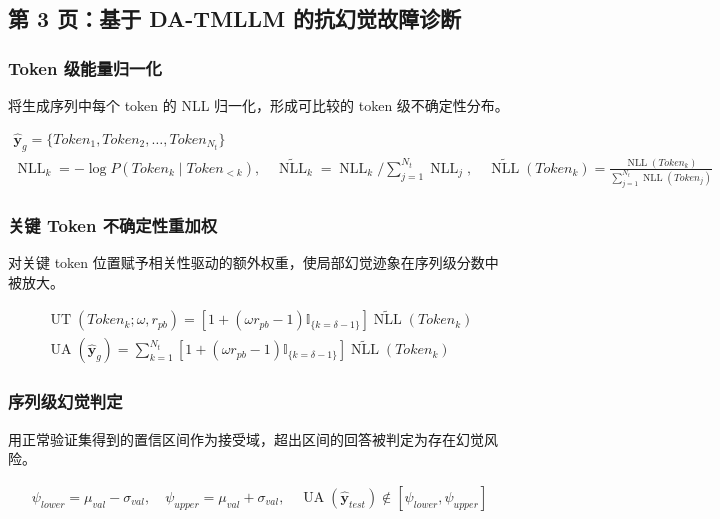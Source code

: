 ﻿\documentclass[UTF8,a4paper,10pt]{ctexart}
\begin{document}
\clearpage
\subsection{第 3 页：基于 DA-TMLLM 的抗幻觉故障诊断}

\subsubsection*{Token 级能量归一化}
将生成序列中每个 token 的 NLL 归一化，形成可比较的 token 级不确定性分布。
\begin{formulabox}
\[\begin{gathered}
  \hat{\bm y}_g
  =\{\mathit{Token}_1,\mathit{Token}_2,\dots,\mathit{Token}_{N_t}\} \\
  \operatorname{NLL}_k
  = -\log P(\mathit{Token}_k\mid \mathit{Token}_{<k}), \quad
  \tilde{\operatorname{NLL}}_k
  =
  \operatorname{NLL}_k\Big/
  \sum_{j=1}^{N_t}\operatorname{NLL}_j, \quad
  \widetilde{\operatorname{NLL}}(\mathit{Token}_k)
  =
  \frac{\operatorname{NLL}(\mathit{Token}_k)}
  {\sum_{j=1}^{N_t}\operatorname{NLL}(\mathit{Token}_j)} 
\end{gathered}\]
\end{formulabox}

\subsubsection*{关键 Token 不确定性重加权}
对关键 token 位置赋予相关性驱动的额外权重，使局部幻觉迹象在序列级分数中被放大。
\begin{formulabox}
\[\begin{gathered}
  \operatorname{UT}(\mathit{Token}_k;\omega,r_{pb})
  =
  \left[1+(\omega r_{pb}-1)\mathbb{I}_{\{k=\delta-1\}}\right]
  \widetilde{\operatorname{NLL}}(\mathit{Token}_k) \\
  \operatorname{UA}(\hat{\bm y}_g)
  =
  \sum_{k=1}^{N_t}
  \left[1+(\omega r_{pb}-1)\mathbb{I}_{\{k=\delta-1\}}\right]
  \widetilde{\operatorname{NLL}}(\mathit{Token}_k)
\end{gathered}\]
\end{formulabox}

\subsubsection*{序列级幻觉判定}
用正常验证集得到的置信区间作为接受域，超出区间的回答被判定为存在幻觉风险。
\begin{formulabox}
\[\begin{gathered}
  \psi_{lower}=\mu_{val}-\sigma_{val}, \quad
  \psi_{upper}=\mu_{val}+\sigma_{val}, \quad
  \operatorname{UA}(\hat{\bm y}_{test})
  \notin[\psi_{lower},\psi_{upper}]
\end{gathered}\]
\end{formulabox}
\end{document}
